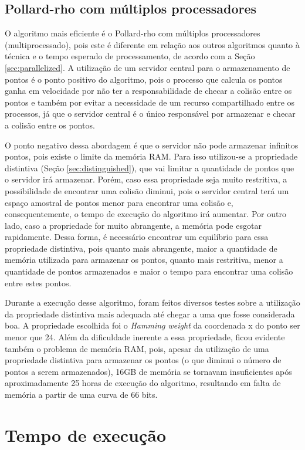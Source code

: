 \subsection{Pollard-rho com múltiplos processadores}
O algoritmo mais eficiente é o Pollard-rho com múltiplos processadores (multiprocessado), pois este é diferente em relação aos outros algoritmos quanto à técnica e o tempo esperado de processamento, de acordo com a Seção \ref{sec:parallelized}. A utilização de um servidor central para o armazenamento de pontos é o ponto positivo do algoritmo, pois o processo que calcula os pontos ganha em velocidade por não ter a responsabilidade de checar a colisão entre os pontos e também por evitar a necessidade de um recurso compartilhado entre os processos, já que o servidor central é o único responsável por armazenar e checar a colisão entre os pontos.

O ponto negativo dessa abordagem é que o servidor não pode armazenar infinitos pontos, pois existe o limite da memória RAM. Para isso utilizou-se a propriedade distintiva (Seção \ref{sec:distinguished}), que vai limitar a quantidade de pontos que o servidor irá armazenar. Porém, caso essa propriedade seja muito restritiva, a possibilidade de encontrar uma colisão diminui, pois o servidor central terá um espaço amostral de pontos menor para encontrar uma colisão e, consequentemente, o tempo de execução do algoritmo irá aumentar. Por outro lado, caso a propriedade for muito abrangente, a memória pode esgotar rapidamente. Dessa forma, é necessário encontrar um equilíbrio para essa propriedade distintiva, pois quanto mais abrangente, maior a quantidade de memória utilizada para armazenar os pontos, quanto mais restritiva, menor a quantidade de pontos armazenados e maior o tempo para encontrar uma colisão entre estes pontos.

Durante a execução desse algoritmo, foram feitos diversos testes sobre a utilização da propriedade distintiva mais adequada até chegar a uma que fosse considerada boa. A propriedade escolhida foi o \textit{Hamming weight} da coordenada x do ponto ser menor que 24. Além da dificuldade inerente a essa propriedade, ficou evidente também o problema de memória RAM, pois, apesar da utilização de uma propriedade distintiva para armazenar os pontos (o que diminui o número de pontos a serem armazenados), 16GB de memória se tornavam insuficientes após aproximadamente 25 horas de execução do algoritmo, resultando em falta de memória a partir de uma curva de 66 bits.

\section{Tempo de execução}
\label{sec:execution_time}

